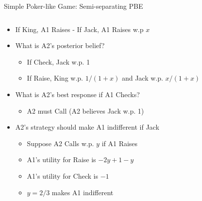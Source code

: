 \documentclass[11pt,aspectratio=169]{beamer}
\begin{document}
  
  \begin{frame}{Simple Poker-like Game: Semi-separating PBE}
   \begin{columns}
    \begin{column}{0.6\textwidth}
     \begin{itemize}[<+->] \scriptsize
      \item If King, A1 Raises - If Jack, A1 Raises w.p $x$
      \item What is A2's posterior belief?
      \begin{itemize}\scriptsize
       \item If Check, Jack w.p. 1
       \item If Raise, King w.p. $1/(1+x)$ and Jack w.p. $x/(1+x)$
      \end{itemize}
      \item What is A2's best response if A1 Checks?
      \begin{itemize}\scriptsize
       \item A2 must Call (A2 believes Jack w.p. 1)
      \end{itemize}
      \item A2's strategy should make A1 indifferent if Jack
      \begin{itemize}\scriptsize
       \item Suppose A2 Calls w.p. $y$ if A1 Raises
       \item A1's utility for Raise is $-2y+1-y$
       \item A1's utility for Check is $-1$
       \item $y = 2/3$ makes A1 indifferent
      \end{itemize}
     \end{itemize}
    \end{column}
    \begin{column}{0.4\textwidth}   
     \begin{center}
\end{center}
\end{column}
\end{columns}
\end{frame}
\end{document}
